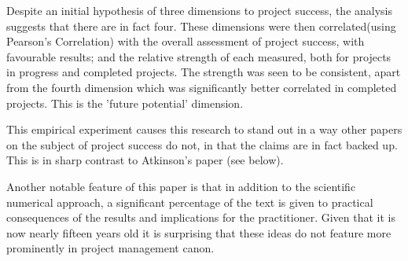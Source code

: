 Despite an initial hypothesis of three dimensions to project success, the analysis suggests that there are in fact four. These dimensions were then correlated(using Pearson's Correlation) with the overall assessment of project success, with favourable results; and the relative strength of each measured, both for projects in progress and completed projects. The strength was seen to be consistent, apart from the fourth dimension which was significantly better correlated in completed projects. This is the 'future potential' dimension. 

This empirical experiment causes this research to stand out in a way other papers on the subject of project success do not, in that the claims are in fact backed up. This is in sharp contrast to Atkinson's paper (see below).

Another notable feature of this paper is that in addition to the scientific numerical approach, a significant percentage of the text is given to practical consequences of the results and implications for the practitioner. Given that it is now nearly fifteen years old it is surprising that these ideas do not feature more prominently in project management canon.
%
%
%


